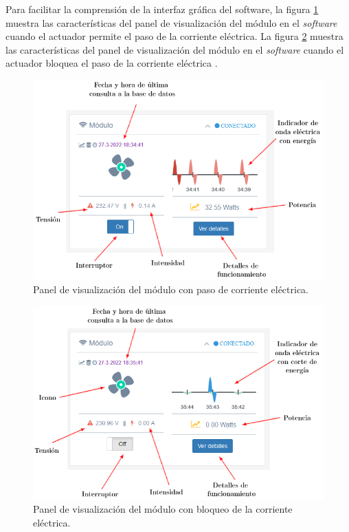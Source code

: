Para facilitar la comprensión de la interfaz gráfica del software, la figura \ref{fig:test-panel5} muestra las características del panel de visualización del módulo en el \emph{software} cuando el actuador permite el paso de la corriente eléctrica. La figura \ref{fig:test-panel4} muestra las características del panel de visualización del módulo en el \emph{software} cuando el actuador bloquea el paso de la corriente eléctrica .

\begin{figure}[htpb]
\centering 
\includegraphics[width=1.0\textwidth]{./Figures/test/consumo/panel5.png}
\caption{Panel de visualización del módulo con paso de corriente eléctrica.}
\label{fig:test-panel5}
\end{figure}


\begin{figure}[htpb]
\centering 
\includegraphics[width=1.0\textwidth]{./Figures/test/consumo/panel4.png}
\caption{Panel de visualización del módulo con bloqueo de la corriente eléctrica.}
\label{fig:test-panel4}
\end{figure}

